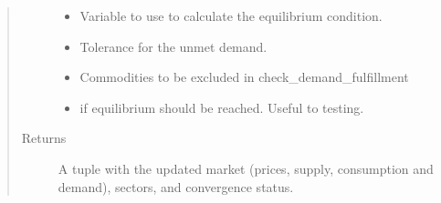 \documentclass[letterpaper,10pt,english]{sphinxmanual}
\begin{document}
\begin{fulllineitems}
\begin{quote}
\begin{description}
\begin{itemize}
\item {} 
 \textendash{} Variable to use to calculate the equilibrium condition.

\item {} 
 \textendash{} Tolerance for the unmet demand.

\item {} 
 \textendash{} Commodities to be excluded in check\_demand\_fulfillment

\item {} 
 \textendash{} if equilibrium should be reached. Useful to testing.

\end{itemize}

\item[{Returns}] \leavevmode
A tuple with the updated market (prices, supply, consumption and demand),
sectors, and convergence status.

\end{description}\end{quote}

\end{fulllineitems}

\end{document}
